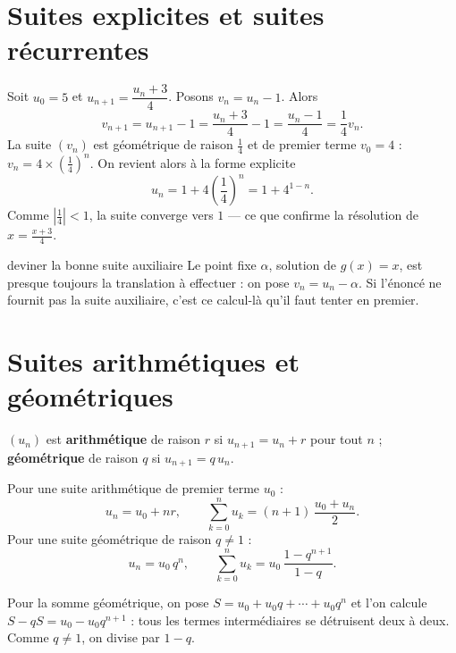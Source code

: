 \section{Suites explicites et suites récurrentes}

\begin{exemple}
Soit $u_{0} = 5$ et $u_{n+1} = \dfrac{u_{n}+3}{4}$. Posons
$v_{n} = u_{n}-1$. Alors
\[
  v_{n+1} = u_{n+1}-1 = \frac{u_{n}+3}{4}-1 = \frac{u_{n}-1}{4}
  = \frac14 v_{n}.
\]
La suite $(v_{n})$ est géométrique de raison $\frac14$ et de premier terme
$v_{0} = 4$ : $v_{n} = 4 \times \left(\frac14\right)^{n}$. On revient alors à
la forme explicite
\[
  u_{n} = 1+4\left(\frac14\right)^{n} = 1+4^{1-n}.
\]
Comme $\left|\frac14\right|<1$, la suite converge vers $1$ — ce que
confirme la résolution de $x = \frac{x+3}{4}$.
\end{exemple}

\begin{methode}{deviner la bonne suite auxiliaire}
Le point fixe $\alpha$, solution de $g(x) = x$, est presque toujours la
translation à effectuer : on pose $v_{n} = u_{n}-\alpha$. Si l'énoncé ne
fournit pas la suite auxiliaire, c'est ce calcul-là qu'il faut tenter en
premier.
\end{methode}

\section{Suites arithmétiques et géométriques}

\begin{definition}
$(u_{n})$ est \textbf{arithmétique} de raison $r$ si $u_{n+1} = u_{n}+r$ pour
tout $n$ ; \textbf{géométrique} de raison $q$ si $u_{n+1} = q\,u_{n}$.
\end{definition}

\begin{propriete}
Pour une suite arithmétique de premier terme $u_{0}$ :
\[
  u_{n} = u_{0}+nr, \qquad
  \sum_{k=0}^{n}u_{k} = (n+1)\,\frac{u_{0}+u_{n}}{2}.
\]
Pour une suite géométrique de raison $q \neq 1$ :
\[
  u_{n} = u_{0}\,q^{n}, \qquad
  \sum_{k=0}^{n}u_{k} = u_{0}\,\frac{1-q^{n+1}}{1-q}.
\]
\end{propriete}

\begin{demonstration}
Pour la somme géométrique, on pose $S = u_{0}+u_{0}q+\cdots+u_{0}q^{n}$ et
l'on calcule $S-qS = u_{0}-u_{0}q^{n+1}$ : tous les termes intermédiaires se
détruisent deux à deux. Comme $q \neq 1$, on divise par $1-q$.
\end{demonstration}

